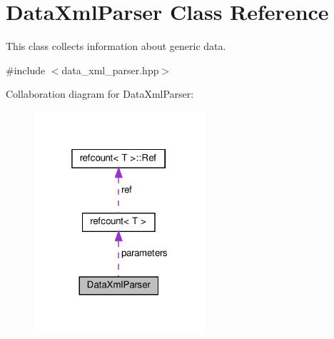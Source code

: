 \hypertarget{classDataXmlParser}{}\section{Data\+Xml\+Parser Class Reference}
\label{classDataXmlParser}


This class collects information about generic data.  




{\ttfamily \#include $<$data\+\_\+xml\+\_\+parser.\+hpp$>$}



Collaboration diagram for Data\+Xml\+Parser\+:
\nopagebreak
\begin{figure}[H]
\begin{center}
\leavevmode
\includegraphics[width=181pt]{da/dd6/classDataXmlParser__coll__graph}
\end{center}
\end{figure}
